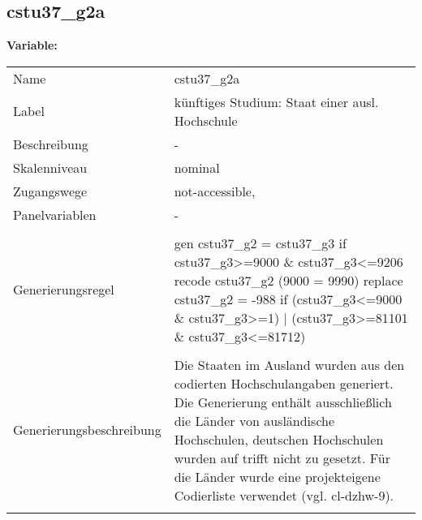 	
	
	\subsection{cstu37\_g2a}
	\label{subSection:cstu37_g2a}

	\noindent\textbf{Variable:}\\
		\begin{tabular}{lL{11.3cm}}
			\label{tableVariable:cstu37_g2a}
			Name & cstu37\_g2a \\
			Label & künftiges Studium: Staat einer ausl. Hochschule \\
			Beschreibung & - \\
			Skalenniveau & nominal \\
			Zugangswege &
				not-accessible,
 \\
			Panelvariablen & -
			 \\
			 \\
					Generierungsregel & gen cstu37\_g2 = cstu37\_g3 if cstu37\_g3\textgreater{}=9000 \& cstu37\_g3\textless{}=9206
recode cstu37\_g2 (9000 = 9990)
replace cstu37\_g2 = -988 if (cstu37\_g3\textless{}=9000 \& cstu37\_g3\textgreater{}=1) | (cstu37\_g3\textgreater{}=81101 \& cstu37\_g3\textless{}=81712) \\
				 \\
					Generierungsbeschreibung & Die Staaten im Ausland wurden aus den codierten Hochschulangaben generiert. Die Generierung enthält ausschließlich die Länder von ausländische Hochschulen, deutschen Hochschulen wurden auf trifft nicht zu gesetzt. Für die Länder wurde eine projekteigene Codierliste verwendet (vgl. cl-dzhw-9).
				 \\	
			 \\
		\end{tabular}






	
	\newpage
